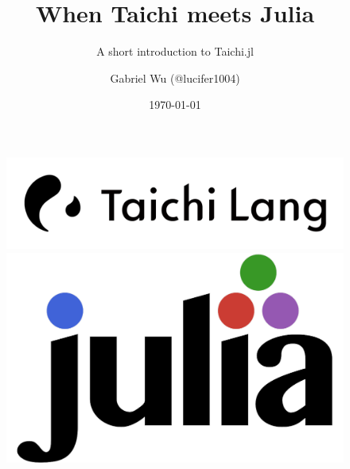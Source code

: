 \documentclass{beamer}
\author{Gabriel Wu (@lucifer1004)}
\title{When Taichi meets Julia}
\subtitle{A short introduction to Taichi.jl}
\date{\today}
\begin{document}
\begin{frame}
    \titlepage
    \begin{figure}[htpb]
        \begin{center}
            \includegraphics[width=0.5\linewidth]{pic/taichi.png}
            \includegraphics[width=0.2\linewidth]{pic/julia.png}
        \end{center}
    \end{figure}
\end{frame}

\begin{frame}
    \tableofcontents[sectionstyle=show,subsectionstyle=show/shaded/hide,subsubsectionstyle=show/shaded/hide]
\end{frame}
\end{document}
